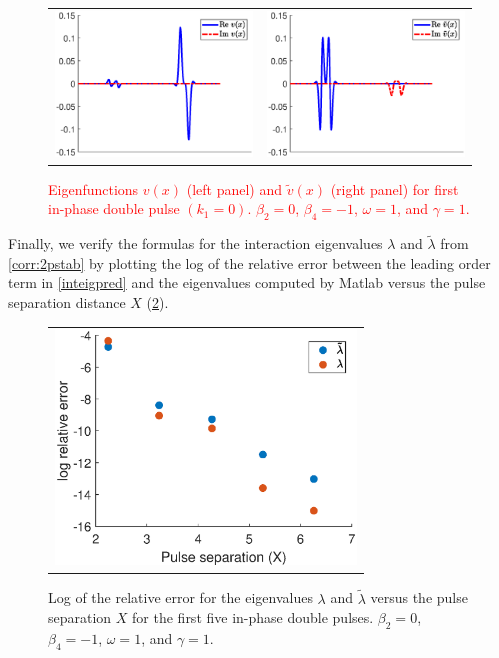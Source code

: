 \documentclass[12pt]{elsarticle}
\newcommand{\revised}[1]{ \textcolor{red}{#1} }
\begin{document}
\begin{figure}[H]
\centering
\begin{tabular}{cc}
\includegraphics[width=8cm]{images/DP0ppvr} &
\includegraphics[width=8cm]{images/DP0ppvi}
\end{tabular}
\caption{\revised{Eigenfunctions $v(x)$ (left panel) and $\tilde{v}(x)$ (right panel) for first in-phase double pulse $(k_1 = 0)$. $\beta_2 = 0$, $\beta_4 = -1$, $\omega = 1$, and $\gamma = 1$.}}
\label{fig:doublevrvi}
\end{figure}

Finally, we verify the formulas for the interaction eigenvalues $\lambda$ and $\tilde{\lambda}$ from \cref{corr:2pstab} by plotting the log of the relative error between the leading order term in \cref{inteigpred} and the eigenvalues computed by Matlab versus the pulse separation distance $X$ (\cref{fig:inteigpred}). 

\begin{figure}[H]
\centering
\begin{tabular}{c}
\includegraphics[width=8cm]{images/inteigpred.eps}
\end{tabular}
\caption{Log of the relative error for the eigenvalues $\lambda$ and $\tilde{\lambda}$ versus the pulse separation $X$ for the first five in-phase double pulses. $\beta_2 = 0$, $\beta_4 = -1$, $\omega = 1$, and $\gamma = 1$.}
\label{fig:inteigpred}
\end{figure}
\end{document}
